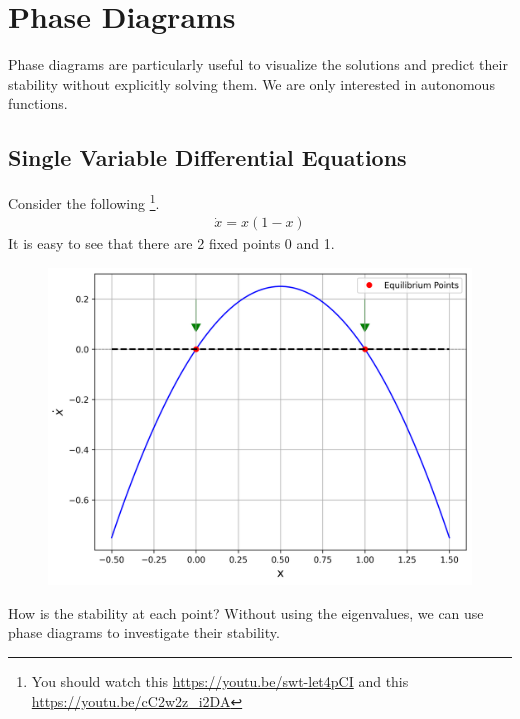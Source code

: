 \documentclass[11pt,a4paper]{book}
\theoremstyle{definition}\newtheorem{definition}{Definition}
\theoremstyle{definition}\newtheorem{fact}{Fact}
\theoremstyle{definition}\newtheorem{remark}{Remark}
\theoremstyle{definition}\newtheorem{ex}{Ex.}
\theoremstyle{definition}\newtheorem{project}{Project}
\theoremstyle{definition}\newtheorem{problem}{Problem}
\theoremstyle{definition}\newtheorem{example}{Example}
\numberwithin{theorem}{section}
\numberwithin{corollary}{chapter}
\numberwithin{assumption}{chapter}
\numberwithin{definition}{chapter}
\numberwithin{prop}{chapter}
\numberwithin{notation}{chapter}
\numberwithin{problem}{chapter}
\numberwithin{example}{chapter}
\numberwithin{fact}{chapter}
\numberwithin{ex}{chapter}
\begin{document}
	\section{Phase Diagrams}
	Phase diagrams are particularly useful to visualize the solutions and predict their stability without explicitly solving them. We are only interested in autonomous functions.
	 
	\subsection{Single Variable Differential Equations}
	Consider the following \footnote{You should watch this \url{https://youtu.be/swt-let4pCI} and this \url{https://youtu.be/cC2w2z_i2DA} }.
	\begin{align*}
		\dot{x} = x (1-x)
	\end{align*}
	It is easy to see that there are 2 fixed points 0 and 1. 
	\begin{figure}[ht]
		\centering
		\includegraphics[scale=0.4]{figs/phase_1ode2.png}
	\end{figure}
	How is the stability at each point? Without using the eigenvalues, we can use phase diagrams to investigate their stability. 
\end{document}
